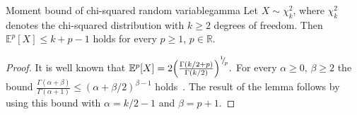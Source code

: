 \begin{lemma}{Moment bound of chi-squared random variable}{gamma}
    Let $X \sim \chi_k^2$, where $\chi_k^2$ denotes the chi-squared distribution with $k \ge 2$ degrees of freedom. Then 
    $
        \mathbb{E}^{{p}}[X] \leq k + p-1
    $ holds for every $p \ge 1$, $p\in \mathbb R$.
\end{lemma}%
\begin{proof}
It is well known that
    $
        \mathbb{E}^{p}[X] = 2 \Big( \frac{\Gamma(k/2+p)}{\Gamma(k/2)} \Big)^{{}^{1}{\mskip -5mu/\mskip -3mu}_{p}}.
    $ For every $\alpha \ge 0$, $\beta \ge 2$ the bound $\frac{\Gamma(\alpha+\beta)}{\Gamma(\alpha + 1)} \le (\alpha+\beta/2)^{\beta-1}$ holds~\cite[Equation 2.2]{laforgia-1984-further-inequalities}. The result of the lemma follows by using this bound with $\alpha = k/2-1$ and $\beta = p+1$.

\end{proof}
